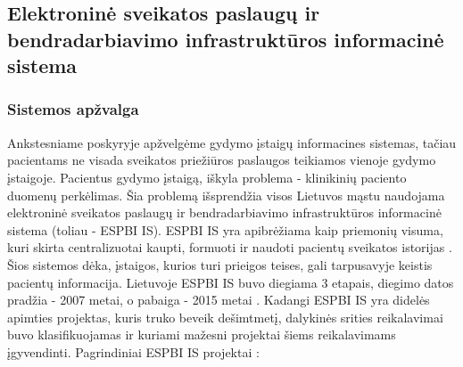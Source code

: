 \subsection{Elektroninė sveikatos paslaugų ir bendradarbiavimo infrastruktūros informacinė sistema}
\subsubsection{Sistemos apžvalga}
Ankstesniame poskyryje apžvelgėme gydymo įstaigų informacines sistemas, tačiau pacientams ne visada sveikatos priežiūros paslaugos teikiamos vienoje gydymo įstaigoje. Pacientus gydymo įstaigą, iškyla problema - klinikinių paciento duomenų perkėlimas. Šia problemą išsprendžia visos Lietuvos mąstu naudojama elektroninė sveikatos paslaugų ir bendradarbiavimo infrastruktūros informacinė sistema (toliau - ESPBI IS). ESPBI IS yra apibrėžiama kaip priemonių visuma, kuri skirta centralizuotai kaupti, formuoti ir naudoti pacientų sveikatos istorijas \cite{ESPBINuostatos}. Šios sistemos dėka, įstaigos, kurios turi prieigos teises, gali tarpusavyje keistis pacientų informacija. Lietuvoje ESPBI IS buvo diegiama 3 etapais, diegimo datos pradžia - 2007 metai, o pabaiga - 2015 metai \cite{Ministras2015}. Kadangi ESPBI IS yra didelės apimties projektas, kuris truko beveik dešimtmetį, dalykinės srities reikalavimai buvo klasifikuojamas ir kuriami mažesni projektai šiems reikalavimams įgyvendinti. Pagrindiniai ESPBI IS projektai \cite{Specifikacija}:
